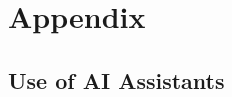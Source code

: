 \documentclass[../report.tex]{subfiles}
\begin{document}
    \section*{Appendix}
    \label{sec:appendix}

    \subsection*{Use of AI Assistants}
\end{document}
